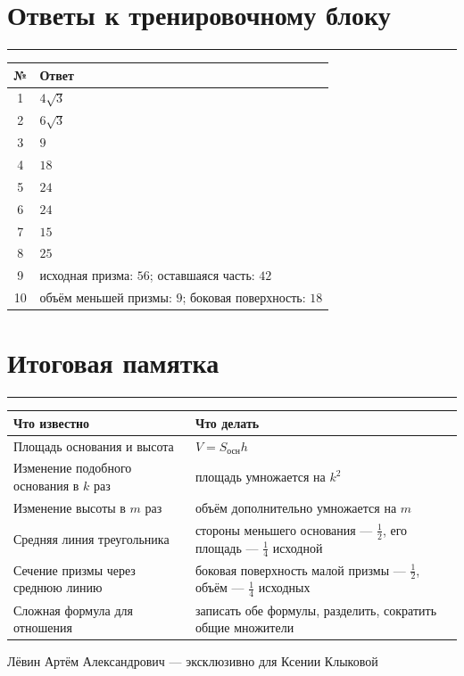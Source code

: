 \documentclass[a4paper,12pt]{article}
\begin{document}
\section*{Ответы к тренировочному блоку}
\noindent\textcolor{accent}{\rule{\linewidth}{0.45pt}}
\vspace{5mm}
\renewcommand{\arraystretch}{1.35}
\begin{center}
\begin{tabularx}{.92\linewidth}{@{}cX@{}}
\toprule
\textbf{№} & \textbf{Ответ}\\
\midrule
1 & $4\sqrt3$\\
2 & $6\sqrt3$\\
3 & $9$\\
4 & $18$\\
5 & $24$\\
6 & $24$\\
7 & $15$\\
8 & $25$\\
9 & исходная призма: $56$; оставшаяся часть: $42$\\
10 & объём меньшей призмы: $9$; боковая поверхность: $18$\\
\bottomrule
\end{tabularx}
\end{center}
\vspace{11mm}
\section*{Итоговая памятка}
\noindent\textcolor{accent}{\rule{\linewidth}{0.45pt}}
\begin{tabularx}{\linewidth}{@{}>{\raggedright\arraybackslash}p{.35\linewidth}X@{}}
\toprule
\textbf{Что известно} & \textbf{Что делать}\\
\midrule
Площадь основания и высота & $V=S_{\text{осн}}h$\\
Изменение подобного основания в $k$ раз & площадь умножается на $k^2$\\
Изменение высоты в $m$ раз & объём дополнительно умножается на $m$\\
Средняя линия треугольника & стороны меньшего основания --- $\frac12$, его площадь --- $\frac14$ исходной\\
Сечение призмы через среднюю линию & боковая поверхность малой призмы --- $\frac12$, объём --- $\frac14$ исходных\\
Сложная формула для отношения & записать обе формулы, разделить, сократить общие множители\\
\bottomrule
\end{tabularx}
\vfill
\begin{center}
{\small\color{lightgray}Лёвин Артём Александрович --- эксклюзивно для Ксении Клыковой}
\end{center}
\end{document}
